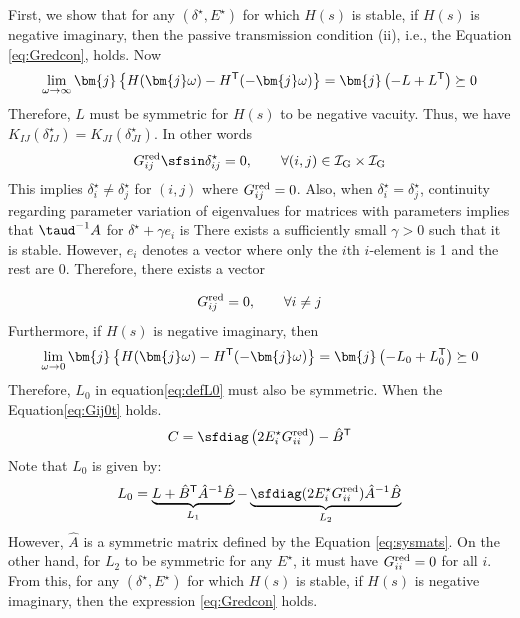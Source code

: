 \documentclass[graybox, envcountchap]{svmult}
\begin{document}
\begin{証明}
First, we show that for any $(\delta^{\star},E^{\star})$ for which $H(s)$ is stable, if $H(s)$ is negative imaginary, then the passive transmission condition (ii), i.e., the Equation \ref{eq:Gredcon}, holds.
Now
\[
\lim_{\omega \rightarrow \infty} \bm{j}
\left\{
H(\bm{j}\omega)-H^{\sf T}(-\bm{j}\omega)
\right\}
=\bm{j}
\left(
-L+L^{\sf T}
\right) \succeq 0
\]
Therefore, $L$ must be symmetric for $H(s)$ to be negative vacuity.
Thus, we have $K_{IJ}(\delta_{IJ}^{\star}) = K_{JI}(\delta_{JI}^{\star})$.
In other words
\[
G^{\rm red}_{ij} \sfsin \delta_{ij}^{\star} = 0 ,\qquad
\forall (i, j) \in \mathcal{I}_{\rm G} \times \mathcal{I}_{\rm G}
\]
This implies $\delta_{i}^{\star}\neq \delta_{j}^{\star}$ for $(i,j)$ where $G^{\rm red}_{ij}=0$.
Also, when $\delta_{i}^{\star}= \delta_{j}^{\star}$, continuity regarding parameter variation of eigenvalues for matrices with parameters implies that $\taud^{-1}A$ for $\delta^{\star}+\gamma e_i$ is There exists a sufficiently small $\gamma>0$ such that it is stable.
However, $e_i$ denotes a vector where only the $i$th $i$-element is 1 and the rest are 0.
Therefore, there exists a vector

\begin{align}\label{eq:Gij0t}
G^{\rm red}_{ij}=0, \qquad
\forall i\neq j
\end{align}
Furthermore, if $H(s)$ is negative imaginary, then
\[
\lim_{\omega \rightarrow 0} \bm{j}
\left\{
H(\bm{j}\omega)-H^{\sf T}(-\bm{j}\omega)
\right\}
=\bm{j}
\left(
-L_0+L_0^{\sf T}
\right) \succeq 0
\]
Therefore, $L_0$ in equation\ref{eq:defL0} must also be symmetric.
When the Equation\ref{eq:Gij0t} holds.
\[
C = \sfdiag \left(
2E_i^{\star} G^{\rm red}_{ii}
\right)  - \hat{B}^{\sf T}
\]
Note that $L_0$ is given by:
\[
L_0 = \underbrace{ L + \hat{B}^{\sf T} \hat{A}^{-1} \hat{B} }_{L_1}
-
\underbrace{ \sfdiag (
2 E_i^{\star} G^{\rm red}_{ii}
) \hat{A}^{-1} \hat{B}
}_{L_2}
\]
However, $\hat{A}$ is a symmetric matrix defined by the Equation \ref{eq:sysmats}.
On the other hand, for $L_2$ to be symmetric for any $E^{\star}$, it must have $G^{\rm red}_{ii}=0$ for all $i$.
From this, for any $(\delta^{\star},E^{\star})$ for which $H(s)$ is stable, if $H(s)$ is negative imaginary, then the expression \ref{eq:Gredcon} holds.


\end{証明}
\end{document}
